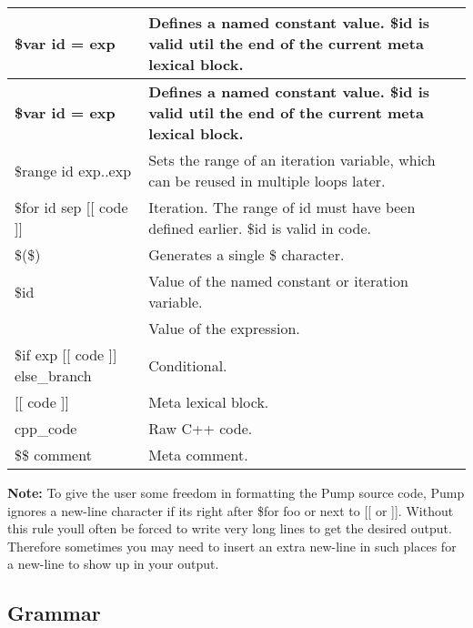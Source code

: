 \tabulinesep=1mm
\begin{longtabu} spread 0pt [c]{*{2}{|X[-1]}|}
\hline
\rowcolor{\tableheadbgcolor}\textbf{ {\ttfamily \$var id = exp} }&\textbf{ Defines a named constant value. {\ttfamily \$id} is valid util the end of the current meta lexical block.  }\\
\endfirsthead
\hline
\endfoot
\hline
\rowcolor{\tableheadbgcolor}\textbf{ {\ttfamily \$var id = exp} }&\textbf{ Defines a named constant value. {\ttfamily \$id} is valid util the end of the current meta lexical block.  }\\
\endhead
{\ttfamily \$range id exp..exp} &Sets the range of an iteration variable, which can be reused in multiple loops later. \\
{\ttfamily \$for id sep \mbox{[}\mbox{[} code \mbox{]}\mbox{]}} &Iteration. The range of {\ttfamily id} must have been defined earlier. {\ttfamily \$id} is valid in {\ttfamily code}. \\
{\ttfamily \$(\$)} &Generates a single {\ttfamily \$} character. \\
{\ttfamily \$id} &Value of the named constant or iteration variable. \\
{\ttfamily } &Value of the expression. \\
{\ttfamily \$if exp \mbox{[}\mbox{[} code \mbox{]}\mbox{]} else\+\_\+branch} &Conditional. \\
{\ttfamily \mbox{[}\mbox{[} code \mbox{]}\mbox{]}} &Meta lexical block. \\
{\ttfamily cpp\+\_\+code} &Raw C++ code. \\
{\ttfamily \$\$ comment} &Meta comment. \\
\end{longtabu}
{\bfseries Note\+:} To give the user some freedom in formatting the Pump source code, Pump ignores a new-\/line character if it\textquotesingle{}s right after {\ttfamily \$for foo} or next to {\ttfamily \mbox{[}\mbox{[}} or {\ttfamily \mbox{]}\mbox{]}}. Without this rule you\textquotesingle{}ll often be forced to write very long lines to get the desired output. Therefore sometimes you may need to insert an extra new-\/line in such places for a new-\/line to show up in your output.

\subsection*{Grammar}


